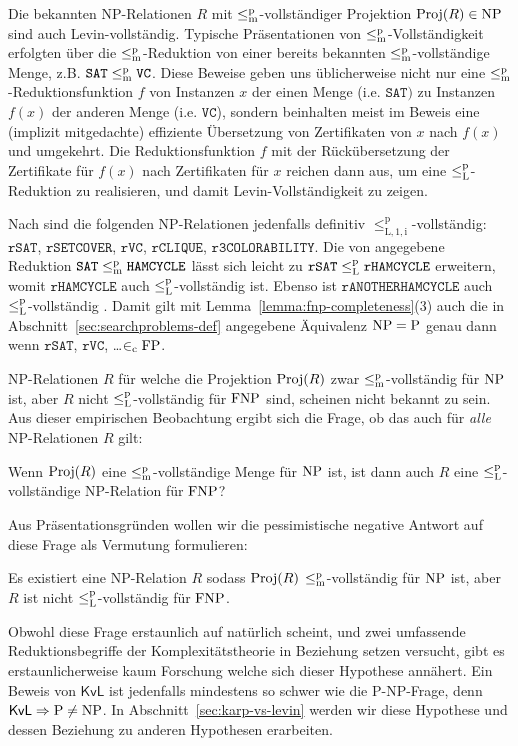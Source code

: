 Die bekannten NP-Relationen $R$ mit $\leq_\mathrm{m}^\mathrm{p}$-vollständiger Projektion $\operatorname{Proj}(R)\in\mathrm{NP}$ sind auch Levin-vollständig. Typische Präsentationen von $\leq_\mathrm{m}^\mathrm{p}$-Vollständigkeit erfolgten über die $\leq_\mathrm{m}^\mathrm{p}$-Reduktion von einer bereits bekannten $\leq_\mathrm{m}^\mathrm{p}$-vollständige Menge, z.B. $\mathtt{SAT}\leq_\mathrm{m}^\mathrm{p} \mathtt{VC}$. Diese Beweise geben uns üblicherweise nicht nur eine $\leq_\mathrm{m}^\mathrm{p}$-Reduktionsfunktion $f$ von Instanzen $x$ der einen Menge (i.e. $\mathtt{SAT})$ zu Instanzen $f(x)$ der anderen Menge (i.e. $\mathtt{VC}$), sondern beinhalten meist im Beweis eine (implizit mitgedachte) effiziente Übersetzung von Zertifikaten von $x$ nach $f(x)$ und umgekehrt. Die Reduktionsfunktion $f$ mit der Rückübersetzung der  Zertifikate für $f(x)$ nach Zertifikaten für $x$ reichen dann aus, um eine $\leq_\mathrm{L}^\mathrm{p}$-Reduktion zu realisieren, und damit Levin-Vollständigkeit zu zeigen.

Nach \textcite[104]{goldreich_computational_2008} sind die folgenden NP-Relationen jedenfalls definitiv $\leq_\mathrm{L,1,i}^\mathrm p$-vollständig: $\mathtt{rSAT}$, $\mathtt{rSETCOVER}$, $\mathtt{rVC}$, $\mathtt{rCLIQUE}$, $\mathtt{r3COLORABILITY}$.
Die von \textcite[193-198]{papadimitriou_computational_1994} angegebene Reduktion $\mathtt{SAT}\leq_\mathrm{m}^\mathrm{p}\mathtt{HAMCYCLE}$ lässt sich leicht zu $\mathtt{rSAT}\leq_\mathrm{L}^\mathrm{p}\mathtt{rHAMCYCLE}$ erweitern, womit $\mathtt{rHAMCYCLE}$ auch $\leq_\mathrm{L}^\mathrm{p}$-vollständig ist.
Ebenso ist $\mathtt{rANOTHERHAMCYCLE}$ auch $\leq_\mathrm{L}^\mathrm{p}$-vollständig \parencite*[232]{papadimitriou_computational_1994}. Damit gilt mit Lemma~\ref{lemma:fnp-completeness}(3) auch die in Abschnitt~\ref{sec:searchproblems-def} angegebene Äquivalenz $\mathrm{NP}=\mathrm{P}$ genau dann wenn $\mathtt{rSAT}$, $\mathtt{rVC}$, \dots $\in_\mathrm{c} \mathrm{FP}$.

NP-Relationen $R$ für welche die Projektion $\operatorname{Proj}(R)$ zwar $\leq_\mathrm{m}^\mathrm{p}$-vollständig für $\mathrm{NP}$ ist, aber $R$ nicht $\leq_\mathrm{L}^\mathrm{p}$-vollständig für $\mathrm{FNP}$ sind, scheinen nicht bekannt zu sein.
Aus dieser empirischen Beobachtung ergibt sich die Frage, ob das auch für \emph{alle} NP-Relationen $R$ gilt: 
\begin{question}\label{question:kvl}
Wenn $\operatorname{Proj}(R)$ eine $\leq_\mathrm{m}^\mathrm{p}$-vollständige Menge für $\mathrm{NP}$ ist, ist dann auch $R$ eine $\leq_\mathrm{L}^\mathrm{p}$-vollständige NP-Relation für $\mathrm{FNP}$?
\end{question}
Aus Präsentationsgründen wollen wir die pessimistische negative Antwort auf diese Frage als Vermutung formulieren:
\begin{conjecture}\label{conj:kvl}
    Es existiert eine NP-Relation $R$ sodass $\operatorname{Proj}(R)$ $\leq_\mathrm{m}^\mathrm{p}$-vollständig für $\mathrm{NP}$ ist, aber $R$ ist nicht $\leq_\mathrm{L}^\mathrm{p}$-vollständig für $\mathrm{FNP}$.
\end{conjecture}
Obwohl diese Frage erstaunlich auf natürlich scheint, und zwei umfassende Reduktionsbegriffe der Komplexitätstheorie in Beziehung setzen versucht, gibt es erstaunlicherweise kaum Forschung welche sich dieser Hypothese annähert.
Ein Beweis von $\mathsf{KvL}$ ist jedenfalls mindestens so schwer wie die P-NP-Frage, denn $\mathsf{KvL}\Rightarrow \mathrm{P}\neq \mathrm{NP}$.
In Abschnitt~\ref{sec:karp-vs-levin} werden wir diese Hypothese und dessen Beziehung zu anderen Hypothesen erarbeiten. %

